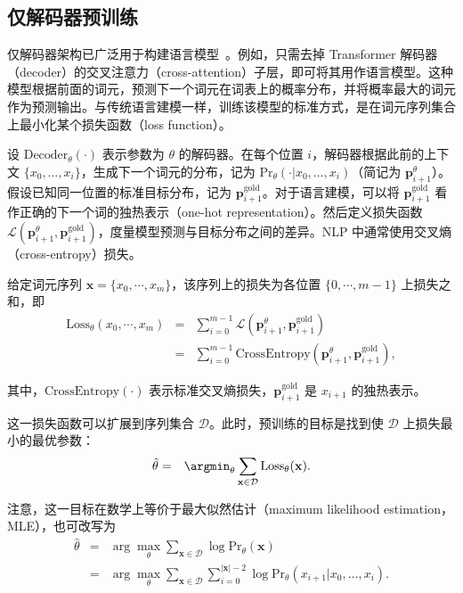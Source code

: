 \subsection{仅解码器预训练}
\label{sec:decoder-only-pre-training}

\noindent 仅解码器架构已广泛用于构建语言模型~\cite{radford-etal:2018improving}。例如，只需去掉 Transformer 解码器（decoder）的交叉注意力（cross-attention）子层，即可将其用作语言模型。这种模型根据前面的词元，预测下一个词元在词表上的概率分布，并将概率最大的词元作为预测输出。与传统语言建模一样，训练该模型的标准方式，是在词元序列集合上最小化某个损失函数（loss function）。

设 $\mathrm{Decoder}_{\theta}(\cdot)$ 表示参数为 $\theta$ 的解码器。在每个位置 $i$，解码器根据此前的上下文 $\{x_0, \dots, x_i\}$，生成下一个词元的分布，记为 $\mathrm{Pr}_{\theta}(\cdot|x_0, \dots, x_i)$（简记为 $\mathbf{p}_{i+1}^{\theta}$）。假设已知同一位置的标准目标分布，记为 $\mathbf{p}_{i+1}^{\mathrm{gold}}$。对于语言建模，可以将 $\mathbf{p}_{i+1}^{\mathrm{gold}}$ 看作正确的下一个词的独热表示（one-hot representation）。然后定义损失函数 $\mathcal{L}(\mathbf{p}_{i+1}^{\theta}, \mathbf{p}_{i+1}^{\mathrm{gold}})$，度量模型预测与目标分布之间的差异。NLP 中通常使用交叉熵（cross-entropy）损失。

给定词元序列 $\mathbf{x} = \{x_0,\cdots,x_m\}$，该序列上的损失为各位置 $\{0,\cdots,m-1\}$ 上损失之和，即
\begin{eqnarray}
\mathrm{Loss}_{\theta}(x_0,\cdots,x_m) & = & \sum_{i=0}^{m-1} \mathcal{L}(\mathbf{p}_{i+1}^{\theta},\mathbf{p}_{i+1}^{\mathrm{gold}}) \nonumber \\
                                       & = & \sum_{i=0}^{m-1} \mathrm{CrossEntropy}(\mathbf{p}_{i+1}^{\theta},\mathbf{p}_{i+1}^{\mathrm{gold}}),
\end{eqnarray}

\noindent 其中，$\mathrm{CrossEntropy}(\cdot)$ 表示标准交叉熵损失，$\mathbf{p}_{i+1}^{\mathrm{gold}}$ 是 $x_{i+1}$ 的独热表示。

这一损失函数可以扩展到序列集合 $\mathcal{D}$。此时，预训练的目标是找到使 $\mathcal{D}$ 上损失最小的最优参数：
\begin{eqnarray}
\hat{\theta} & = & \argmin_{\theta} \sum_{\mathbf{x} \in \mathcal{D}} \mathrm{Loss}_{\theta}(\mathbf{x}).
\end{eqnarray}

\noindent 注意，这一目标在数学上等价于最大似然估计（maximum likelihood estimation，MLE），也可改写为
\begin{eqnarray}
\hat{\theta} & = & \arg\max_{\theta} \sum_{\mathbf{x} \in \mathcal{D}} \log \mathrm{Pr}_{\theta}(\mathbf{x}) \nonumber \\
             & = & \arg\max_{\theta} \sum_{\mathbf{x} \in \mathcal{D}} \sum_{i=0}^{|\mathbf{x}|-2} \log \mathrm{Pr}_{\theta}(x_{i+1} | x_0, \dots, x_{i}).
\end{eqnarray}

